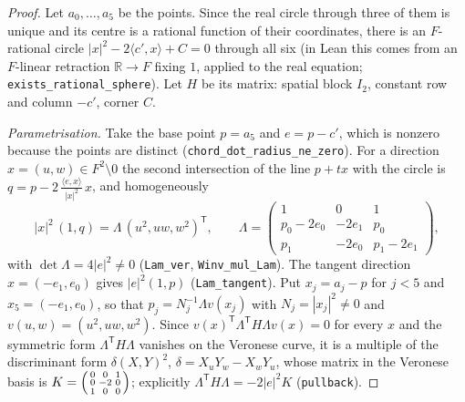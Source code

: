 \documentclass[11pt]{article}
\theoremstyle{definition}
\theoremstyle{remark}
\newcommand{\R}{\mathbb{R}}
\begin{document}
\begin{proof}
Let $a_0, \dots, a_5$ be the points. Since the real circle through three of them is unique and its
centre is a rational function of their coordinates, there is an $F$-rational circle
$|x|^2 - 2\langle c', x\rangle + C = 0$ through all six (in Lean this comes from an $F$-linear
retraction $\R \to F$ fixing $1$, applied to the real equation; \texttt{exists\_rational\_sphere}).
Let $H$ be its matrix: spatial block $I_2$, constant row and column $-c'$, corner $C$.

\emph{Parametrisation.} Take the base point $p = a_5$ and $e = p - c'$, which is nonzero because the
points are distinct (\texttt{chord\_dot\_radius\_ne\_zero}). For a direction
$x = (u, w) \in F^2 \setminus 0$ the second intersection of the line $p + tx$ with the circle is
$q = p - 2\,\frac{\langle e, x\rangle}{|x|^2}\, x$, and homogeneously
\[
|x|^2 \, (1, q) = \Lambda \, (u^2, uw, w^2)^{\mathsf T},
\qquad
\Lambda =
\begin{pmatrix} 1 & 0 & 1 \\ p_0 - 2e_0 & -2e_1 & p_0 \\ p_1 & -2e_0 & p_1 - 2e_1 \end{pmatrix},
\]
with $\det \Lambda = 4|e|^2 \neq 0$ (\texttt{Lam\_ver}, \texttt{Winv\_mul\_Lam}). The tangent direction
$x = (-e_1, e_0)$ gives $|e|^2 (1, p)$ (\texttt{Lam\_tangent}). Put $x_j = a_j - p$ for $j < 5$ and
$x_5 = (-e_1, e_0)$, so that $p_j = N_j^{-1} \Lambda v(x_j)$ with $N_j = |x_j|^2 \ne 0$ and
$v(u,w) = (u^2, uw, w^2)$. Since $v(x)^{\mathsf T} \Lambda^{\mathsf T} H \Lambda v(x) = 0$ for every $x$
and the symmetric form $\Lambda^{\mathsf T} H \Lambda$ vanishes on the Veronese curve, it is a multiple of the
discriminant form $\delta(X, Y)^2$, $\delta = X_u Y_w - X_w Y_u$, whose matrix in the Veronese basis is
$K = \begin{psmallmatrix} 0 & 0 & 1 \\ 0 & -2 & 0 \\ 1 & 0 & 0\end{psmallmatrix}$; explicitly
$\Lambda^{\mathsf T} H \Lambda = -2|e|^2 K$ (\texttt{pullback}).


\end{proof}
\end{document}

